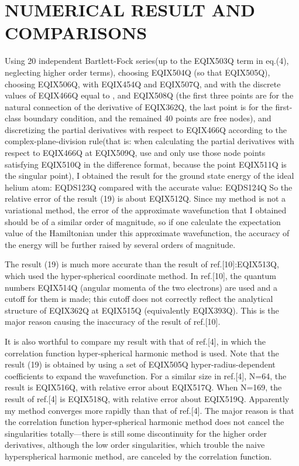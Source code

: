 \section{NUMERICAL RESULT AND COMPARISONS}

Using 20 independent Bartlett-Fock series(up to the EQIX503Q term in eq.(4),
neglecting higher order terms),
choosing EQIX504Q (so that EQIX505Q), choosing EQIX506Q, with
EQIX454Q and EQIX507Q, and
with the discrete values of EQIX466Q
equal to , and
EQIX508Q (the first three
points are for the natural connection of the derivative of EQIX362Q,
the last point is for the first-class
boundary condition, and the remained 40 points are free nodes),
and discretizing the partial derivatives with respect to EQIX466Q according
to the complex-plane-division rule(that is: when calculating the partial
derivatives with respect to EQIX466Q at EQIX509Q, use and only use
those node points satisfying EQIX510Q in the difference format, because the
point EQIX511Q is the singular point), I obtained the
result for the ground state
energy of the ideal helium atom:
 EQDS123Q 
compared with the accurate value:
 EQDS124Q 
So the relative error of the result (19) is about EQIX512Q.
Since my method is not a variational method,
the error of the approximate wavefunction
that I obtained should be of a similar order of magnitude, so if one
calculate the expectation value of the Hamiltonian under this approximate
wavefunction, the accuracy of the energy will be further raised by
several orders of magnitude.

The result (19) is much more accurate than the result
of ref.[10]:EQIX513Q, which
used the hyper-spherical coordinate method.
In ref.[10], the quantum numbers EQIX514Q
(angular momenta of the two electrons) are used and a cutoff for them
is made; this cutoff does not correctly reflect the analytical
structure of EQIX362Q at EQIX515Q (equivalently EQIX393Q). This is the major
reason causing the inaccuracy of the result of ref.[10].

It is also worthful to compare my result with that of ref.[4], in which
the correlation function hyper-spherical harmonic method is used. Note that
the result (19) is obtained by using a set of EQIX505Q
hyper-radius-dependent coefficients to expand the wavefunction. For a similar
size in ref.[4], N=64, the result is EQIX516Q, with relative error
about EQIX517Q. When N=169, the result of ref.[4] is
EQIX518Q, with relative error about EQIX519Q. Apparently
my method converges more rapidly than that of ref.[4]. The major reason
is that the correlation function hyper-spherical harmonic method does not
cancel the singularities totally---there is still some discontinuity
for the higher order derivatives, although the low order singularities,
which trouble the naive hyperspherical harmonic method, are canceled by
the correlation function.

